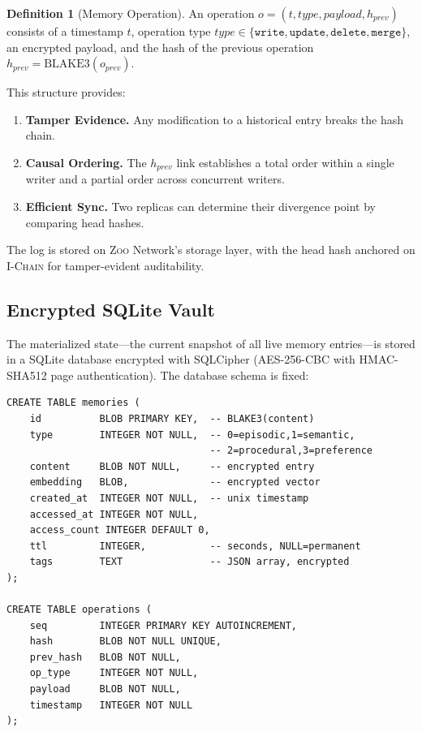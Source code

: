 \documentclass[11pt,letterpaper]{article}
\theoremstyle{definition}
\newtheorem{definition}{Definition}
\theoremstyle{remark}
\newcommand{\Zoo}{\textsc{Zoo}}
\newcommand{\IChain}{\textsc{I-Chain}}
\begin{document}
\begin{definition}[Memory Operation]
An operation $o = (t, \textit{type}, \textit{payload}, h_{\textit{prev}})$ consists of a timestamp $t$, operation type $\textit{type} \in \{\texttt{write}, \texttt{update}, \texttt{delete}, \texttt{merge}\}$, an encrypted payload, and the hash of the previous operation $h_{\textit{prev}} = \text{BLAKE3}(o_{\textit{prev}})$.
\end{definition}

This structure provides:
\begin{enumerate}
    \item \textbf{Tamper Evidence.} Any modification to a historical entry breaks the hash chain.
    \item \textbf{Causal Ordering.} The $h_{\textit{prev}}$ link establishes a total order within a single writer and a partial order across concurrent writers.
    \item \textbf{Efficient Sync.} Two replicas can determine their divergence point by comparing head hashes.
\end{enumerate}

The log is stored on \Zoo{} Network's storage layer, with the head hash anchored on \IChain{} for tamper-evident auditability.

\subsection{Encrypted SQLite Vault}

The materialized state---the current snapshot of all live memory entries---is stored in a SQLite database encrypted with SQLCipher (AES-256-CBC with HMAC-SHA512 page authentication). The database schema is fixed:

\begin{verbatim}
CREATE TABLE memories (
    id          BLOB PRIMARY KEY,  -- BLAKE3(content)
    type        INTEGER NOT NULL,  -- 0=episodic,1=semantic,
                                   -- 2=procedural,3=preference
    content     BLOB NOT NULL,     -- encrypted entry
    embedding   BLOB,              -- encrypted vector
    created_at  INTEGER NOT NULL,  -- unix timestamp
    accessed_at INTEGER NOT NULL,
    access_count INTEGER DEFAULT 0,
    ttl         INTEGER,           -- seconds, NULL=permanent
    tags        TEXT               -- JSON array, encrypted
);

CREATE TABLE operations (
    seq         INTEGER PRIMARY KEY AUTOINCREMENT,
    hash        BLOB NOT NULL UNIQUE,
    prev_hash   BLOB NOT NULL,
    op_type     INTEGER NOT NULL,
    payload     BLOB NOT NULL,
    timestamp   INTEGER NOT NULL
);
\end{verbatim}
\end{document}
